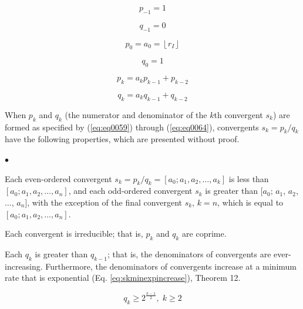 \documentclass{esub2acm}
\newenvironment{propenum}{\begin{list}
               {$\bullet$}{\setlength{\labelwidth}{3mm}\setlength{\leftmargin}{6mm}}}
               {\end{list}}
\begin{document}
\begin{equation}
\label{eq:eq0059}
p_{ - 1}  = 1
\end{equation}

\begin{equation}
\label{eq:eq0060}
q_{ - 1}  = 0
\end{equation}

\begin{equation}
\label{eq:eq0061}
p_0  = a_0  = \left\lfloor {r_I } \right\rfloor
\end{equation}

\begin{equation}
\label{eq:eq0062}
q_0  = 1
\end{equation}

\begin{equation}
\label{eq:eq0063}
p_k  = a_k p_{k - 1}  + p_{k - 2}
\end{equation}

\begin{equation}
\label{eq:eq0064}
q_k  = a_k q_{k - 1}  + q_{k - 2}
\end{equation}

When $p_{k}$ and $q_{k}$ (the numerator and denominator of the
$k$th convergent $s_{k}$) are formed as specified by (\ref{eq:eq0059})
through (\ref{eq:eq0064}), convergents $s_{k}=p_{k}/q_{k}$ have the following
properties, which are presented without proof.

\begin{propenum}

\item Each even-ordered convergent
      $s_{k} = p_k/q_k = [a_{0}; a_{1}, a_{2}, \ldots{}, a_{k}]$
      is less than $[a_{0}; a_{1}, a_{2}, \ldots{}, a_{n}]$, and
      each odd-ordered convergent $s_{k}$ is greater than
      $[a_{0}$; $a_{1}$, $a_{2}$, $\ldots{}$, $a_{n}]$,
      with the exception of the final convergent $s_{k}$, $k=n$,
      which is equal to $[a_{0}; a_{1}, a_{2}, \ldots{}, a_{n}]$.

\item Each convergent is irreducible; that is, $p_k$ and
      $q_k$ are coprime.

\item Each $q_{k}$ is greater than $q_{k-1}$; that is, the denominators
      of convergents are ever-increasing.  Furthermore, the
      denominators of convergents
      increase at a minimum rate that is exponential
      (Eq. \ref{eq:skminexpincrease}), \cite{KhinchinClassic} Theorem 12.

      \begin{equation}
      \label{eq:skminexpincrease}
      q_k \geq 2^{\frac{k-1}{2}}, \; k \geq 2
      \end{equation}

\end{propenum}
\end{document}
